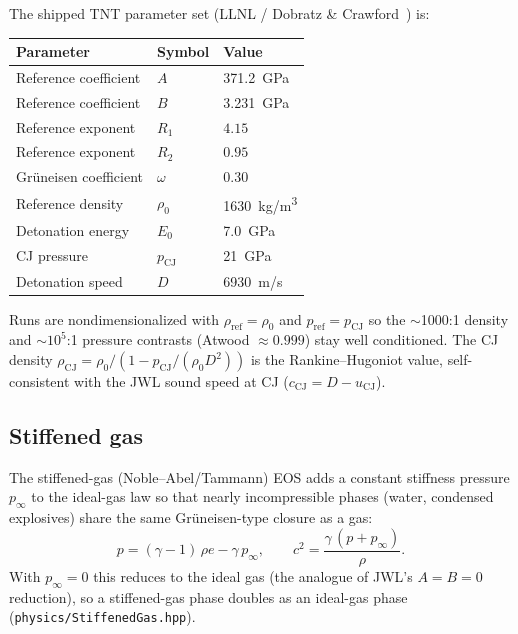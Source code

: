 \documentclass[11pt]{article}
\newcommand{\code}[1]{\texttt{#1}}
\begin{document}
The shipped TNT parameter set (LLNL / Dobratz \& Crawford~\cite{dobratz_crawford_1985}) is:
\begin{center}
\begin{tabular}{lll}
\toprule
Parameter & Symbol & Value \\
\midrule
Reference coefficient & $A$ & \SI{371.2}{GPa} \\
Reference coefficient & $B$ & \SI{3.231}{GPa} \\
Reference exponent    & $R_1$ & $4.15$ \\
Reference exponent    & $R_2$ & $0.95$ \\
Gr\"uneisen coefficient & $\omega$ & $0.30$ \\
Reference density     & $\rho_0$ & \SI{1630}{kg/m^3} \\
Detonation energy     & $E_0$ & \SI{7.0}{GPa} \\
CJ pressure           & $p_{\mathrm{CJ}}$ & \SI{21}{GPa} \\
Detonation speed      & $D$ & \SI{6930}{m/s} \\
\bottomrule
\end{tabular}
\end{center}
Runs are nondimensionalized with $\rho_{\text{ref}}=\rho_0$ and
$p_{\text{ref}}=p_{\mathrm{CJ}}$ so the $\sim$1000:1 density and $\sim$$10^5$:1
pressure contrasts (Atwood $\approx 0.999$) stay well conditioned. The CJ density
$\rho_{\mathrm{CJ}} = \rho_0/(1 - p_{\mathrm{CJ}}/(\rho_0 D^2))$ is the
Rankine--Hugoniot value, self-consistent with the JWL sound speed at CJ
($c_{\mathrm{CJ}} = D - u_{\mathrm{CJ}}$).

\subsection{Stiffened gas}
The stiffened-gas (Noble--Abel/Tammann) EOS adds a constant stiffness pressure
$p_\infty$ to the ideal-gas law so that nearly incompressible phases (water,
condensed explosives) share the same Gr\"uneisen-type closure as a gas:
\begin{equation}
p = (\gamma-1)\,\rho e - \gamma\,p_\infty, \qquad
c^2 = \frac{\gamma\,(p + p_\infty)}{\rho}.
\end{equation}
With $p_\infty=0$ this reduces to the ideal gas (the analogue of JWL's $A=B=0$
reduction), so a stiffened-gas phase doubles as an ideal-gas phase
(\code{physics/StiffenedGas.hpp}).
\end{document}
